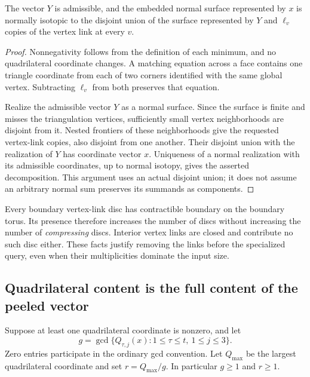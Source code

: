 \begin{lemma}
\label{lem:vertex-link-peeling}
The vector $Y$ is admissible, and the embedded normal surface represented by
$x$ is normally isotopic to the disjoint union of the surface represented by
$Y$ and $\ell_v$ copies of the vertex link at every $v$.
\end{lemma}
\begin{proof}
Nonnegativity follows from the definition of each minimum, and no
quadrilateral coordinate changes. A matching equation across a face contains
one triangle coordinate from each of two corners identified with the same
global vertex. Subtracting $\ell_v$ from both preserves that equation.

Realize the admissible vector $Y$ as a normal surface. Since the surface is
finite and misses the triangulation vertices, sufficiently small vertex
neighborhoods are disjoint from it. Nested frontiers of these neighborhoods
give the requested vertex-link copies, also disjoint from one another.
Their disjoint union with the realization of $Y$ has coordinate vector $x$.
Uniqueness of a normal realization with its admissible coordinates, up to
normal isotopy, gives the asserted decomposition. This argument uses an
actual disjoint union; it does not assume an arbitrary normal sum preserves
its summands as components.
\end{proof}

Every boundary vertex-link disc has contractible boundary on the boundary
torus. Its presence therefore increases the number of discs without
increasing the number of \emph{compressing} discs. Interior vertex links
are closed and contribute no such disc either. These facts justify removing
the links before the specialized query, even when their multiplicities
dominate the input size.

\subsection{Quadrilateral content is the full content of the peeled vector}

Suppose at least one quadrilateral coordinate is nonzero, and let
\[
 g=\gcd\{Q_{\tau,j}(x):1\le\tau\le t,\ 1\le j\le3\}.
\]
Zero entries participate in the ordinary gcd convention. Let
$Q_{\max}$ be the largest quadrilateral coordinate and set $r=Q_{\max}/g$.
In particular $g\ge1$ and $r\ge1$.

